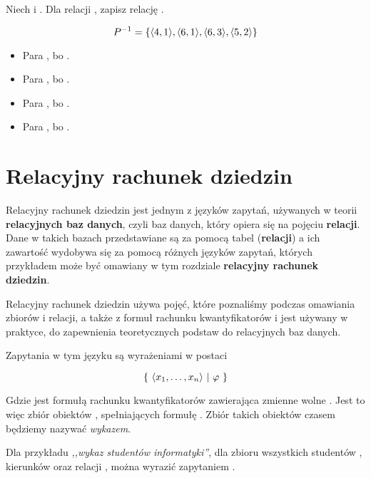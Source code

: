 \begin{example}
Niech  i . Dla relacji , zapisz relację .

\[
 P^{-1} = \{ \langle 4,1 \rangle, \langle 6,1 \rangle, \langle 6,3 \rangle, \langle 5,2 \rangle \}
\]
\begin{itemize}
    \item Para , bo .  
    \item Para , bo .  
    \item Para , bo .  
    \item Para , bo .  
\end{itemize}

\end{example}

\section{Relacyjny rachunek dziedzin}

Relacyjny rachunek dziedzin jest jednym z języków zapytań, używanych w teorii \textbf{relacyjnych baz danych}, czyli baz danych, który opiera się na pojęciu \textbf{relacji}. Dane w takich bazach przedstawiane są za pomocą tabel (\textbf{relacji}) a ich zawartość wydobywa się za pomocą różnych języków zapytań, których przykładem może być omawiany w tym rozdziale \textbf{relacyjny rachunek dziedzin}. 

Relacyjny rachunek dziedzin używa pojęć, które poznaliśmy podczas omawiania zbiorów i relacji, a także z formuł rachunku kwantyfikatorów i jest używany w praktyce, do zapewnienia teoretycznych podstaw do relacyjnych baz danych.

Zapytania w tym języku są wyrażeniami w postaci

\[
    \{\ \langle x_1, \dots, x_n \rangle\ |\ \varphi\ \}
\]

Gdzie \m{\varphi} jest formułą rachunku kwantyfikatorów zawierająca zmienne wolne . Jest to więc zbiór obiektów , spełniających formułę \m{\varphi}. Zbiór takich obiektów czasem będziemy nazywać \textit{wykazem}. 

Dla przykładu \textit{,,wykaz studentów informatyki''}, dla zbioru wszystkich studentów , kierunków  oraz relacji , można wyrazić zapytaniem .

